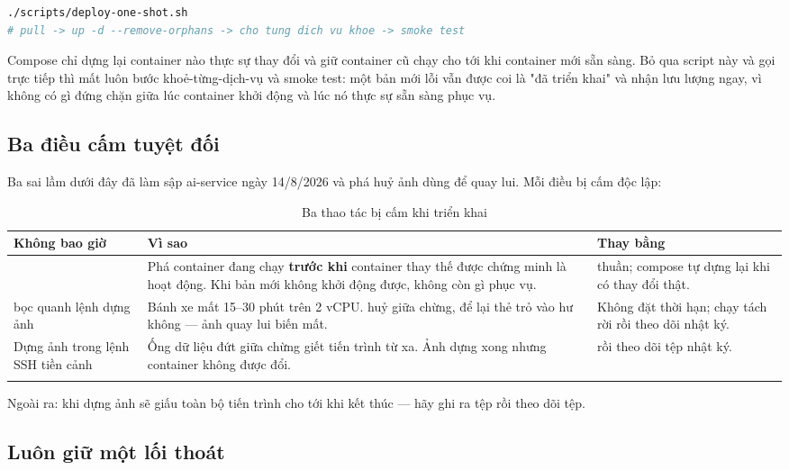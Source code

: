 \begin{lstlisting}[language=bash]
./scripts/deploy-one-shot.sh
# pull -> up -d --remove-orphans -> cho tung dich vu khoe -> smoke test
\end{lstlisting}

Compose chỉ dựng lại container nào thực sự thay đổi và giữ container cũ chạy cho tới khi
container mới sẵn sàng. Bỏ qua script này và gọi  trực tiếp thì
mất luôn bước khoẻ-từng-dịch-vụ và smoke test: một bản mới lỗi vẫn được coi là "đã triển
khai" và nhận lưu lượng ngay, vì không có gì đứng chặn giữa lúc container khởi động và lúc
nó thực sự sẵn sàng phục vụ.

\subsection{Ba điều cấm tuyệt đối}

Ba sai lầm dưới đây đã làm sập ai-service ngày 14/8/2026 và phá huỷ ảnh dùng để quay lui.
Mỗi điều bị cấm độc lập:

\begin{longtable}{L{3.6cm} L{5.0cm} L{5.0cm}}
\toprule
\textbf{Không bao giờ} & \textbf{Vì sao} & \textbf{Thay bằng}\\
\midrule
\endhead
{} & Phá container đang chạy \textbf{trước khi} container thay thế được chứng minh là hoạt động. Khi bản mới không khởi động được, không còn gì phục vụ. &  thuần; compose tự dựng lại khi có thay đổi thật.\\
 bọc quanh lệnh dựng ảnh & Bánh xe  mất 15--30 phút trên 2 vCPU.  huỷ giữa chừng, để lại thẻ  trỏ vào hư không — ảnh quay lui biến mất. & Không đặt thời hạn; chạy tách rời rồi theo dõi nhật ký.\\
Dựng ảnh trong lệnh SSH tiền cảnh & Ống dữ liệu đứt giữa chừng giết tiến trình từ xa. Ảnh dựng xong nhưng container không được đổi. &  rồi theo dõi tệp nhật ký.\\
\bottomrule
\caption{Ba thao tác bị cấm khi triển khai}
\end{longtable}

Ngoài ra:  khi dựng ảnh sẽ giấu toàn bộ tiến trình cho tới khi kết thúc —
hãy ghi ra tệp rồi theo dõi tệp.

\subsection{Luôn giữ một lối thoát}

